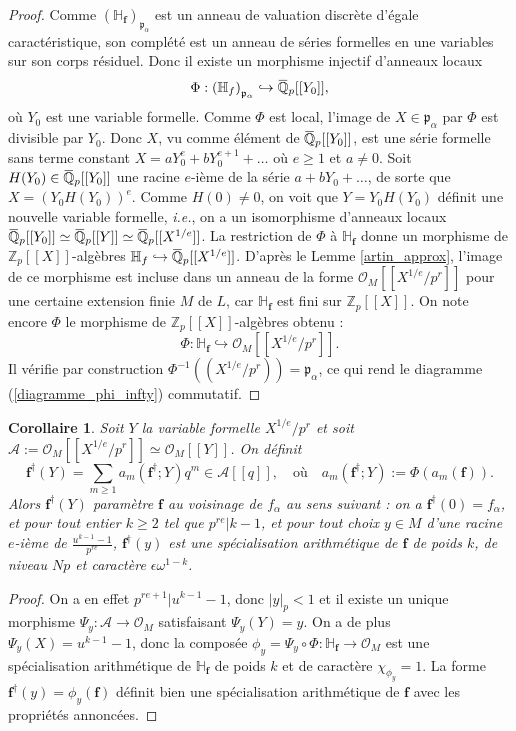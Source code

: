 \documentclass[12pt]{amsart}
\newcommand\bQ{\mathbb{Q}}
\newcommand\bH{\mathbb{H}}
\newcommand\Zp{{\mathbb{Z}_{p}}}
\newcommand\cA{\mathcal{A}}
\newcommand\cO{\mathcal{O}}
\newcommand\gp{\mathfrak{p}}
\newcommand{\ob}[1]{\mkern 1.5mu\overline{\mkern-1.5mu#1\mkern-1.5mu}\mkern 1.5mu}
\theoremstyle{defstyle}
\theoremstyle{thmstyle}
\newtheorem{corollaire}[subsubsection]{Corollaire}
\begin{document}
\begin{proof}
	Comme $\left(\bH_\textbf{f}\right)_{\gp_\alpha}$ est un anneau de valuation discrète d'égale caractéristique, son complété est un anneau de séries formelles en une variables sur son corps résiduel. Donc il existe un morphisme injectif d'anneaux locaux
	$$\Phi : \left(\bH_\textbf{f}\right)_{\gp_\alpha} \hookrightarrow \ob{\bQ}_p[[Y_0]],$$
	où $Y_0$ est une variable formelle. Comme $\Phi$ est local, l'image de $X\in \gp_\alpha$ par $\Phi$ est divisible par $Y_0$. Donc $X$, vu comme élément de $\ob{\bQ}_p[[Y_0]]$, est une série formelle sans terme constant $X=aY_0^e + bY_0^{e+1} + \ldots$ où $e\geq 1$ et $a\neq 0$. Soit $H(Y_0)\in \ob{\bQ}_p[[Y_0]]$ une racine $e$-ième de la série $a+bY_0+\ldots$, de sorte que $X=\left(Y_0 H(Y_0)\right)^e$. Comme $H(0)\neq 0$, on voit que $Y=Y_0 H(Y_0)$ définit une nouvelle variable formelle, \textit{i.e.}, on a un isomorphisme d'anneaux locaux $\ob{\bQ}_p[[Y_0]]\simeq\ob{\bQ}_p[[Y]]\simeq \ob{\bQ}_p[[X^{1/e}]]$. La restriction de $\Phi$ à $\bH_\textbf{f}$ donne un morphisme de $\Zp[[X]]$-algèbres $\bH_\textbf{f} \hookrightarrow \ob{\bQ}_p[[X^{1/e}]]$. D'après le Lemme \ref{artin_approx}, l'image de ce morphisme est incluse dans un anneau de la forme $\cO_M[[X^{1/e}/p^r]]$ pour une certaine extension finie $M$ de $L$, car $\bH_\textbf{f}$ est fini sur $\Zp[[X]]$. On note encore $\Phi$ le morphisme de $\Zp[[X]]$-algèbres obtenu :
	$$\Phi : \bH_\textbf{f} \hookrightarrow \cO_M[[X^{1/e}/p^r]].$$
	Il vérifie par construction $\Phi^{-1}\left((X^{1/e}/p^r)\right)=\gp_\alpha$, ce qui rend le diagramme (\ref{diagramme_phi_infty}) commutatif.
\end{proof}

\begin{corollaire}\label{fdag}
	Soit $Y$ la variable formelle $X^{1/e}/p^r$ et soit $\cA:=\cO_M[[X^{1/e}/p^r]]\simeq \cO_M[[Y]]$. On définit 
	$$\textbf{f}^\dag(Y)=\sum_{m\geq 1} a_m(\textbf{f}^\dag;Y)q^m \in \cA[[q]], \quad \textrm{où} \quad a_m(\textbf{f}^\dag;Y):=\Phi(a_m(\textbf{f})).$$
	Alors $\textbf{f}^\dag(Y)$ paramètre $\textbf{f}$ au voisinage de $f_\alpha$ au sens suivant : on a $\textbf{f}^\dag(0)=f_\alpha$, et pour tout entier $k\geq 2$ tel que $p^{re}|k-1$, et pour tout choix $y\in M$ d'une racine $e$-ième de $\frac{u^{k-1}-1}{p^{re}}$, $\textbf{f}^\dag(y)$ est une spécialisation arithmétique de $\textbf{f}$ de poids $k$, de niveau $Np$ et caractère $\epsilon \omega^{1-k}$.
\end{corollaire}

\begin{proof}
	On a en effet $p^{re+1}|u^{k-1}-1$, donc $|y|_p <1$ et il existe un unique morphisme $\Psi_y :\cA \longrightarrow \cO_M$ satisfaisant $\Psi_y(Y)=y$. On a de plus $\Psi_y(X)=u^{k-1}-1$, donc la composée $\phi_y =\Psi_y \circ \Phi : \bH_\textbf{f} \longrightarrow \cO_M$ est une spécialisation arithmétique de $\bH_\textbf{f}$ de poids $k$ et de caractère $\chi_{\phi_y}=1$. La forme $\textbf{f}^\dag(y)=\phi_y(\textbf{f})$ définit bien une spécialisation arithmétique de $\textbf{f}$ avec les propriétés annoncées.
\end{proof}
\end{document}
